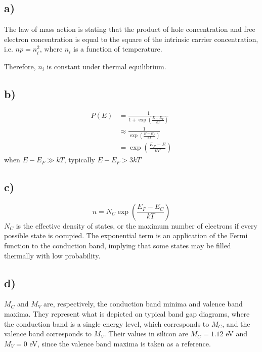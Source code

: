 \subsection*{a)}
The law of mass action is stating that the product of hole concentration and free electron concentration is equal to the square of the intrinsic carrier concentration, i.e. $n p = n_i^2$, where $n_i$ is a function of temperature.

Therefore, $n_i$ is constant under thermal equilibrium.
\subsection*{b)}
\[
\begin{aligned}
P(E) &= \frac{1}{1+\exp\left(\frac{E-E_F}{k T}\right)} \\
	 &\approx \frac{1}{\exp\left(\frac{E-E_F}{k T}\right)} \\
	 &= \exp\left(\frac{E_F - E}{k T}\right)
\end{aligned}
\]
when $E - E_F \gg k T$, typically $E - E_F > 3 k T $
\subsection*{c)}
$$n = N_C \exp \left(\frac{E_F - E_C}{k T} \right)$$
$N_C$ is the effective density of states, or the maximum number of electrons if every possible state is occupied.
The exponential term is an application of the Fermi function to the conduction band, implying that some states 
may be filled thermally with low probability.
\subsection*{d)}
$M_C$ and $M_V$ are, respectively, the conduction band minima and valence band maxima. They represent what is depicted on typical band gap diagrams, where the conduction band is a single energy level, which corresponds to $M_C$, and the valence band corresponds to $M_V$. Their values in silicon are $M_C = 1.12$ eV and $M_V = 0$ eV, since the valence band maxima is taken as a reference. %